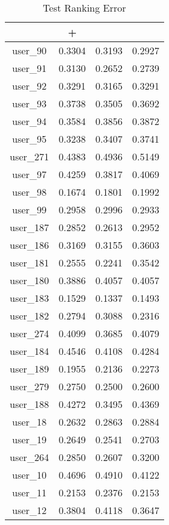 \begin{table}[ht]\footnotesize
\centering
\caption{Test Ranking Error}
\label{Table:mil_test_error}
\begin{tabular}{|c|c|c|c|}
  \hline
          &\RB{}+  &  \CRB{}  &  \RB{}\\ 
  \hline
user_90  &  0.3304   &  0.3193   &  0.2927 \\ 
user_91  &  0.3130   &  0.2652   &  0.2739 \\ 
user_92  &  0.3291   &  0.3165   &  0.3291 \\ 
user_93  &  0.3738   &  0.3505   &  0.3692 \\ 
user_94  &  0.3584   &  0.3856   &  0.3872 \\ 
user_95  &  0.3238   &  0.3407   &  0.3741 \\ 
user_271  &  0.4383   &  0.4936   &  0.5149 \\ 
user_97  &  0.4259   &  0.3817   &  0.4069 \\ 
user_98  &  0.1674   &  0.1801   &  0.1992 \\ 
user_99  &  0.2958   &  0.2996   &  0.2933 \\ 
user_187  &  0.2852   &  0.2613   &  0.2952 \\ 
user_186  &  0.3169   &  0.3155   &  0.3603 \\ 
user_181  &  0.2555   &  0.2241   &  0.3542 \\ 
user_180  &  0.3886   &  0.4057   &  0.4057 \\ 
user_183  &  0.1529   &  0.1337   &  0.1493 \\ 
user_182  &  0.2794   &  0.3088   &  0.2316 \\ 
user_274  &  0.4099   &  0.3685   &  0.4079 \\ 
user_184  &  0.4546   &  0.4108   &  0.4284 \\ 
user_189  &  0.1955   &  0.2136   &  0.2273 \\ 
user_279  &  0.2750   &  0.2500   &  0.2600 \\ 
user_188  &  0.4272   &  0.3495   &  0.4369 \\ 
user_18  &  0.2632   &  0.2863   &  0.2884 \\ 
user_19  &  0.2649   &  0.2541   &  0.2703 \\ 
user_264  &  0.2850   &  0.2607   &  0.3200 \\ 
user_10  &  0.4696   &  0.4910   &  0.4122 \\ 
user_11  &  0.2153   &  0.2376   &  0.2153 \\ 
user_12  &  0.3804   &  0.4118   &  0.3647 \\ 

\end{tabular}
\end{table}
